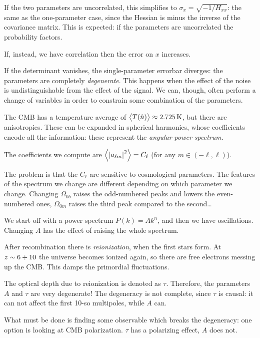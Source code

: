 \documentclass[main.tex]{subfiles}
\begin{document}
If the two parameters are uncorrelated, this simplifies to \(\sigma _x = \sqrt{- 1 / H_{xx}}\): the same as the one-parameter case, since the Hessian is minus the inverse of the covariance matrix.
This is expected: if the parameters are uncorrelated the probability factors.

If, instead, we have correlation then the error on \(x\) increases.

If the determinant vanishes, the single-parameter errorbar diverges: the parameters are completely \emph{degenerate}. 
This happens when the effect of the noise is undistinguishable from the effect of the signal. 
We can, though, often perform a change of variables in order to constrain some combination of the parameters. 

The CMB has a temperature average of \(\expval{T(\hat{n})} \approx \SI{2.725}{K}\), but there are anisotropies. 
These can be expanded in spherical harmonics, whose coefficients encode all the information: these represent the \emph{angular power spectrum}.

The coefficients we compute are \(\expval{\abs{a_{\ell m}}^2} = C_\ell\) (for any \(m \in (- \ell, \ell)\)). 


The problem is that the \(C_\ell\) are sensitive to cosmological parameters. The features of the spectrum we change are different depending on which parameter we change. 
Changing \(\Omega _{0b}\) raises the odd-numbered peaks and lowers the even-numbered ones, \(\Omega _{0m}\) raises the third peak compared to the second\dots 

We start off with a power spectrum \(P(k) = A k^{n}\), and then we have oscillations. Changing \(A\) has the effect of raising the whole spectrum. 

After recombination there is \emph{reionization}, when the first stars form. At \(z \sim 6 \divisionsymbol 10\) the universe becomes ionized again, so there are free electrons messing up the CMB. This damps the primordial fluctuations. 

The optical depth due to reionization is denoted as \(\tau \). 
Therefore, the parameters \(A\) and \(\tau \) are very degenerate!
The degeneracy is not complete, since \(\tau \) is causal: it can not affect the first 10-so multipoles, while \(A\) can.

What must be done is finding some observable which breaks the degeneracy: one option is looking at CMB polarization.
\(\tau \) has a polarizing effect, \(A\) does not. 
\end{document}
